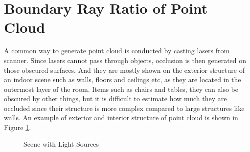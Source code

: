\documentclass[11pt, a4paper,oneside,chapterprefix=false]{scrbook}
\begin{document}
\section{Boundary Ray Ratio of Point Cloud}

A common way to generate point cloud is conducted by casting lasers from scanner. Since lasers cannot pass through objects, occlusion is then generated on those obscured surfaces. And they are mostly shown on the exterior structure of an indoor scene such as walls, floors and ceilings etc, as they are located in the outermost layer of the room. Items such as chairs and tables, they can also be obscured by other things, but it is difficult to estimate how much they are occluded since their structure is more complex compared to large structures like walls. An example of exterior and interior structure of point cloud is shown in Figure \ref{fig:Exterior and interior structure of a point cloud}.

\begin{figure}[H]
    \centering
     \label{fig:exterior} 
     \label{fig:interior}
    \caption{Scene with Light Sources}
    \label{fig:Exterior and interior structure of a point cloud}
\end{figure}

\vspace{10pt}
\end{document}
